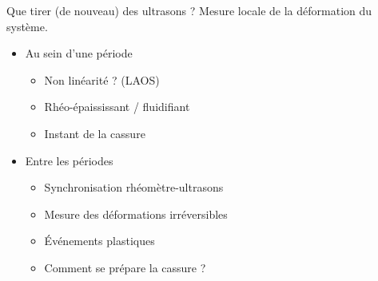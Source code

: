 \documentclass{beamer}
\begin{document}
\begin{frame}{Que tirer (de nouveau) des ultrasons ?}
Mesure locale de la déformation du système.
\begin{itemize}
\item Au sein d'une période
\begin{itemize}
	\item Non linéarité ? (LAOS)
	\item Rhéo-épaississant / fluidifiant
	\item Instant de la cassure
\end{itemize}
\item Entre les périodes
\begin{itemize}
	\item Synchronisation rhéomètre-ultrasons
	\item Mesure des déformations irréversibles
	\item Événements plastiques
	\item Comment se prépare la cassure ?
\end{itemize}
\end{itemize}
\end{frame}
\end{document}
